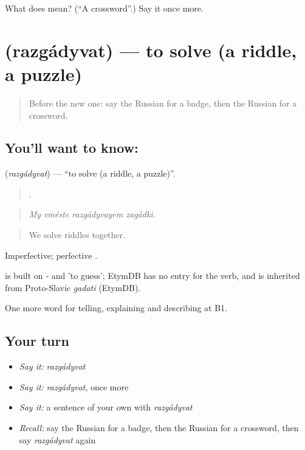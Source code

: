 \begin{tcolorbox}[breakable,colback=teal!4,colframe=teal!35!black,title={Before you move on}]
What does  mean? (\textquotedblleft{}A crossword\textquotedblright{}.) Say it once more.
\end{tcolorbox}
\section[\texorpdfstring{\ru{разгадывать} (razgádyvat)}{разгадывать (razgádyvat)}]{ (razgádyvat) — to solve (a riddle, a puzzle)}

\label{lesson:RU-C503-razgadyvat}



\begin{quote}
Before the new one: say the Russian for a badge, then the Russian for a crossword.
\end{quote}

\subsection*{You'll want to know: }
\textbf{} (\emph{razgádyvat}) — \textquotedblleft{}to solve (a riddle, a puzzle)\textquotedblright{}.

\begin{quote}
   .
\end{quote}

\begin{quote}
\emph{My vméste razgádyvayem zagádki.}
\end{quote}

\begin{quote}
We solve riddles together.
\end{quote}

Imperfective; perfective .

\begin{cousinweb}
\emph{} is built on \emph{-} and \emph{} 'to guess'; EtymDB has no entry for the verb, and \emph{} is inherited from Proto-Slavic \emph{gadati} (EtymDB).
\end{cousinweb}

\begin{grammarlens}[title={What you've built}]
One more word for telling, explaining and describing at B1.
\end{grammarlens}

\subsection*{Your turn}
\begin{itemize}
\raggedright
  \item \emph{Say it:} \emph{razgádyvat}
  \item \emph{Say it:} \emph{razgádyvat}, once more
  \item \emph{Say it:} a sentence of your own with \emph{razgádyvat}
  \item \emph{Recall:} say the Russian for a badge, then the Russian for a crossword, then say \emph{razgádyvat} again
\end{itemize}

